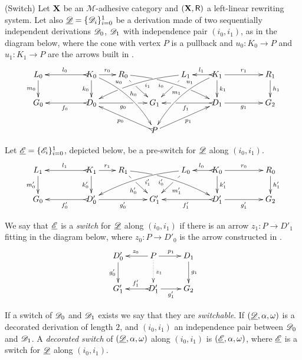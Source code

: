\begin{definition}(Switch) 	Let $\textbf {\textup{X}}$ be an $\mathcal{M}$-adhesive category and $(\textbf {\textup{X}}, \mathsf{R})$ a left-linear rewriting system. 
	Let also $\underline{\mathscr{D}}=\{\mathscr{D}_i\}_{i=0}^1$ be a derivation made
	of two sequentially independent derivations $\mathscr{D}_0$,
	$\mathscr{D}_1$ with independence pair $(i_0, i_1)$, as in the diagram below, where the cone with vertex $P$ is a pullback and $u_0\colon K_0\to P$ and $u_1\colon K_1\to P$ are the arrows built in .
	\[\xymatrix@R=20pt@C=20pt{L_0 \ar[d]_{m_0}&& K_0 \ar @/^.35cm/[ddrr]^(.3){u_0}
		\ar[d]_{k_0}\ar@{>->}[ll]_{l_0} \ar[r]^{r_0} & R_0
		\ar@{>}@/^.25cm/[drrr]|(.32)\hole_(.4){i_0}|(.68)\hole
		\ar[dr]|(.33)\hole_{h_0} && L_1 \ar@{>}@/_.25cm/[dlll]^(.4){i_1}|(.68)\hole 
		\ar[dl]|(.33)\hole^{m_1}& K_1 \ar[d]^{k_1}\ar@{>->}[l]_{l_1} \ar @/_.35cm/[ddll]_(.3){u_1}
		\ar[rr]^{r_1} && R_1 \ar[d]^{h_1}\\G_0 && \ar@{>->}[ll]^{f_0}
		D_0 \ar[rr]_{g_0}|(.7)\hole&& G_1 && \ar@{>->}[ll]^{f_1}|(.7)\hole D_1
		\ar[rr]_{g_1}&& G_2 \\ & & & & P \ar[urr]_{p_1} \ar@{>->}[ull]^{p_0}}
	\]
	
	Let $\underline{\mathscr{E}}=\{\mathscr{E}_i\}_{i=0}^1$, depicted below, be a pre-switch for $\underline{\mathscr{D}}$ along $(i_0,i_1)$.
	\[
	\xymatrix@R=20pt@C=20pt{
		{L_1} \ar[d]_{m_0'}
		&&  {K_1} \ar@{>->}[ll]_{l_1} \ar[r]^{r_1} \ar[d]_{k_0'}
		&  {R_1} \ar[dr]|(.33)\hole_{h_0'}  \ar@/^.25cm/@{>}_(.4){i_0'}|(.32)\hole[drrr]
		& & 
		{L_0}\ar[dl]|(.33)\hole^{m_1'} \ar@/_.25cm/@{>}^(.4){i_1'}[dlll] 
		&  {K_0} \ar@{>->}[l]_{l_0} \ar[rr]^{r_0} \ar[d]^{k_1'}
		& & {R_0} \ar[d]^{h_1'} \\		
		{G_0}
		& & {D_0'} \ar@{>->}[ll]^{f_0'} \ar[rr]_{g_0'}
		& &  {G'_1} 
		& &  {D_1'} \ar@{>->}[ll]^{f_1'} \ar[rr]_{g_1'}
		& & {G_2}  }
	\]
	
	We say that $\underline{\mathscr{E}}$ is a \emph{switch} for $\underline{\mathscr{D}}$ along $(i_0, i_1)$ if there is an arrow $z_1\colon P\to D'_1$ fitting in the diagram below, where $z_0\colon P\to D'_0$ is the arrow constructed in .
	\[\xymatrix{D'_0  \ar[d]_{g'_0}& P \ar[r]^{p_1} \ar[l]_{z_0} \ar@{.>}[d]^{z_1} & D_1 \ar[d]^{g_1}\\ G'_1 & D'_1 \ar[r]_{g'_1} \ar@{>->}[l]_{f'_1} & G_2}\]
	
	
	If a switch of $\mathscr{D}_0$ and $\mathscr{D}_1$ exists we say that they are \emph{switchable}. If $(\underline{\mathscr{D}}, \alpha, \omega)$ is a decorated derivation of length $2$, and $(i_0, i_1)$ an independence pair between $\mathscr{D}_0$ and $\mathscr{D}_1$. A \emph{decorated switch} of $(\underline{\mathscr{D}}, \alpha, \omega)$ along $(i_0, i_1)$ is $(\underline{\mathscr{E}}, \alpha, \omega)$, where $\underline{\mathscr{E}}$ is a switch for $\underline{\mathscr{D}}$ along $(i_0, i_1)$.
\end{definition}

